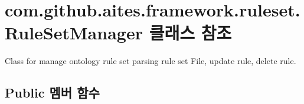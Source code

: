 \hypertarget{classcom_1_1github_1_1aites_1_1framework_1_1ruleset_1_1_rule_set_manager}{}\section{com.\+github.\+aites.\+framework.\+ruleset.\+Rule\+Set\+Manager 클래스 참조}
\label{classcom_1_1github_1_1aites_1_1framework_1_1ruleset_1_1_rule_set_manager}


Class for manage ontology rule set parsing rule set File, update rule, delete rule.  


\subsection*{Public 멤버 함수}
